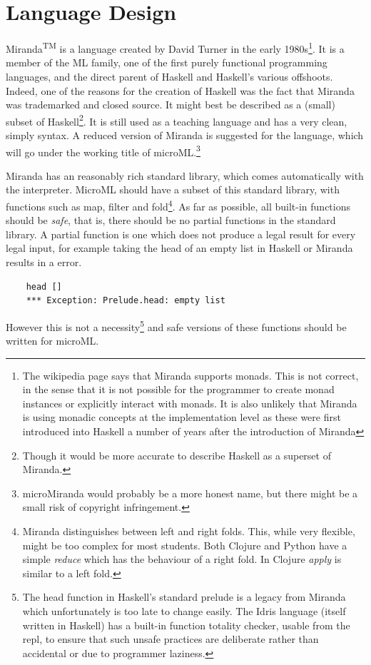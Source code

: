 \documentclass[12pt, a4paper]{report}
\begin{document}
\section{Language Design} 
\label{sec:lang}
Miranda\textsuperscript{TM} is a language
created by David Turner in the early 1980s\footnote{The wikipedia page says that Miranda supports
monads. This is not correct, in the sense that it is not possible for the programmer to create
monad instances or explicitly interact with monads. It is also unlikely that Miranda is using
monadic concepts at the implementation level as these were first introduced into Haskell a number of
years after the introduction of Miranda}. It is a member of the ML family, one of the first purely
functional programming languages, and the direct parent of Haskell and Haskell's various offshoots.
Indeed, one of the reasons for the creation of Haskell was the fact that Miranda was trademarked and
closed source. It might best be described as a (small) subset of Haskell\footnote{Though it would
be more accurate to describe Haskell as a superset of Miranda.}. It is still used as a teaching
language and has a very clean, simply syntax. A reduced version of Miranda is suggested for the
language, which will go under the working title of microML.\footnote{microMiranda would probably be
a more honest name, but there might be a small risk of copyright infringement.}

Miranda has an reasonably rich standard library, which comes automatically with the interpreter. MicroML
should have a subset of this standard library, with functions such as map, filter and fold\footnote{Miranda 
    distinguishes between left and right folds. This, while very flexible, might be
too complex for most students. Both Clojure and Python have a simple \textit{reduce} which has the
behaviour of a right fold. In Clojure \textit{apply} is similar to a left fold.}. As far as possible, 
all built-in functions should be \textit{safe}, that is, there should be no
partial functions in the standard library. A partial function is one which does not produce a legal
result for every legal input, for example taking the head of an empty list in Haskell or Miranda
results in a error.

\begin{verbatim}
    head []
    *** Exception: Prelude.head: empty list
\end{verbatim} 

However this is not a necessity\footnote{The head function in Haskell's standard prelude is a legacy
    from Miranda which unfortunately is too late to change easily. The Idris language (itself
    written in Haskell) has a built-in function totality checker, usable from the repl, to ensure
that such unsafe practices are deliberate rather than accidental or due to programmer laziness.} 
and safe versions of these functions should be written for microML. 
\end{document}
